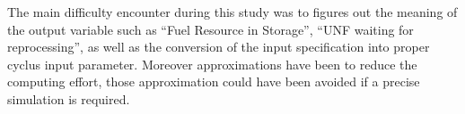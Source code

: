 \documentclass[12pt]{article}
\begin{document}
The main difficulty encounter during this study was to figures out the meaning
of the output variable such as ``Fuel Resource in Storage'', ``UNF waiting for
reprocessing'', as well as the conversion of the input specification into proper
cyclus input parameter. Moreover approximations have been to reduce the
computing effort, those approximation could have been avoided if a precise
simulation is required.







\end{document}
